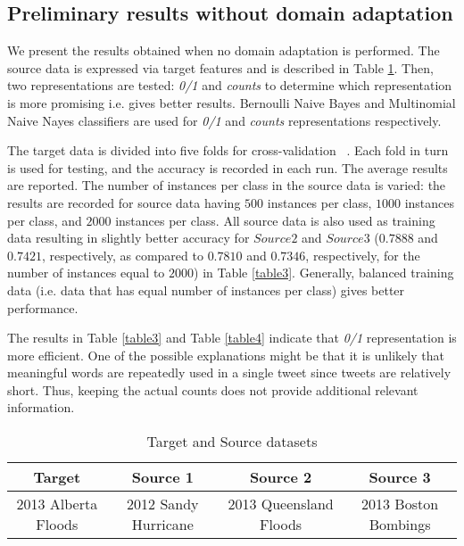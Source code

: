 \subsection{Preliminary results without domain adaptation}
\label{preresults}

We present the results obtained when no domain adaptation is performed. The source data is expressed via target features and is described in Table \ref{table1}. Then, two representations are tested: \textit{0/1} and \textit{counts} to determine which representation is more promising i.e. gives better results. Bernoulli Naive Bayes and Multinomial Naive Nayes classifiers are used for \textit{0/1} and \textit{counts} representations respectively. 

The target data is divided into five folds for cross-validation ~\citep{hastie}. Each fold in turn is used for testing, and the accuracy is recorded in each run. The average results are reported. The number of instances per class in the source data is varied: the results are recorded for source data having $500$ instances per class, $1000$ instances per class, and $2000$ instances per class. All source data is also used as training data resulting in slightly better accuracy for $Source 2$ and $Source  3$ ($0.7888$ and $0.7421$, respectively, as compared to $0.7810$ and $0.7346$, respectively, for the number of instances equal to $2000$) in Table \ref{table3}. Generally, balanced training data (i.e. data that has equal number of instances per class) gives better performance.

The results in Table \ref{table3} and Table \ref{table4} indicate that \textit{0/1} representation is more efficient. One of the possible explanations might be that it is unlikely that meaningful words are repeatedly used in a single tweet since tweets are relatively short. Thus, keeping the actual counts does not provide additional relevant information.


\begin{table}[ht]
    \begin{center}
    \caption{Target and Source datasets}
    \begin{tabular}[c]{|c|c|c|c|}
        \hline
        Target & Source 1 & Source 2 & Source 3 \\
        \hline
        2013 Alberta Floods & 2012 Sandy Hurricane & 2013 Queensland Floods & 2013 Boston Bombings \\
        \hline
    \end{tabular}
    \label{table1}
   \end{center}
\end{table}


